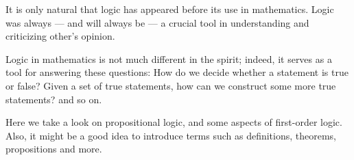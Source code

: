  \label{chap:logic}

It is only natural that
logic has appeared before its use in mathematics.
Logic was always
---
and will always be
---
a crucial tool in understanding and criticizing other's opinion.

Logic in mathematics is not much different in the spirit;
indeed, it serves as a tool for answering these questions:
How do we decide whether a statement is true or false?
Given a set of true statements,
how can we construct some more true statements?
and so on.

Here we take a look on propositional logic,
and some aspects of first-order logic.
Also, it might be a good idea to introduce terms
such as definitions, theorems, propositions and more.